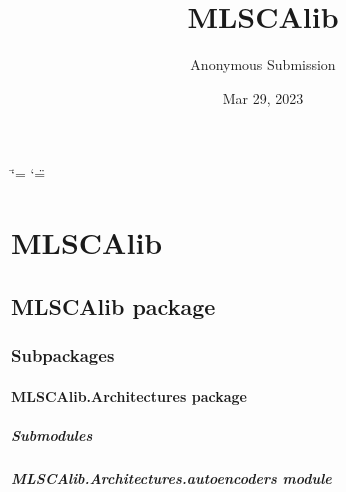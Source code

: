 \documentclass[letterpaper,10pt,english]{sphinxmanual}
\title{MLSCAlib}
\date{Mar 29, 2023}
\author{Anonymous Submission}
\begin{document}
\ifdefined\shorthandoff
  \ifnum\catcode`\=\string=\active\shorthandoff{=}\fi
  \ifnum\catcode`\"=\active{}\fi
\fi

\pagestyle{empty}
\sphinxmaketitle
\pagestyle{plain}
\sphinxtableofcontents
\pagestyle{normal}
\label{\detokenize{index::doc}}


\sphinxstepscope


\chapter{MLSCAlib}
\label{\detokenize{modules:mlscalib}}\label{\detokenize{modules::doc}}
\sphinxstepscope


\section{MLSCAlib package}
\label{\detokenize{MLSCAlib:mlscalib-package}}\label{\detokenize{MLSCAlib::doc}}

\subsection{Subpackages}
\label{\detokenize{MLSCAlib:subpackages}}
\sphinxstepscope


\subsubsection{MLSCAlib.Architectures package}
\label{\detokenize{MLSCAlib.Architectures:mlscalib-architectures-package}}\label{\detokenize{MLSCAlib.Architectures::doc}}

\paragraph{Submodules}
\label{\detokenize{MLSCAlib.Architectures:submodules}}

\paragraph{MLSCAlib.Architectures.autoencoders module}
\label{\detokenize{MLSCAlib.Architectures:module-MLSCAlib.Architectures.autoencoders}}\label{\detokenize{MLSCAlib.Architectures:mlscalib-architectures-autoencoders-module}}
\end{document}
